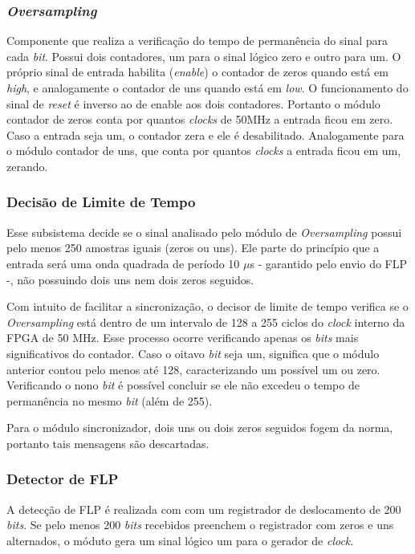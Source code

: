 	\subsubsection{\textit{Oversampling}}
	Componente que realiza a verificação do tempo de permanência do sinal para cada \textit{bit}. Possui dois contadores, um para o sinal lógico zero e outro para um. O próprio sinal de entrada habilita (\textit{enable}) o contador de zeros quando está em \textit{high}, e analogamente o contador de uns quando está em \textit{low}. O funcionamento do sinal de \textit{reset} é inverso ao de enable aos dois contadores. Portanto o módulo contador de zeros conta por quantos \textit{clocks} de 50MHz a entrada ficou em zero. Caso a entrada seja um, o contador zera e ele é desabilitado. Analogamente para o módulo contador de uns, que conta por quantos \textit{clocks} a entrada ficou em um, zerando.

	\subsubsection{Decisão de Limite de Tempo}
	Esse subsistema decide se o sinal analisado pelo módulo de \textit{Oversampling} possui pelo menos 250 amostras iguais (zeros ou uns). Ele parte do princípio que a entrada será uma onda quadrada de período 10 $\mu$s - garantido pelo envio do FLP -, não possuindo dois uns nem dois zeros seguidos.
	
	Com intuito de facilitar a sincronização, o decisor de limite de tempo verifica se o \textit{Oversampling} está dentro de um intervalo de 128 a 255 ciclos do \textit{clock} interno da FPGA de 50 MHz. Esse processo ocorre verificando apenas os \textit{bits} mais significativos do contador. Caso o oitavo \textit{bit} seja um, significa que o módulo anterior contou pelo menos até 128, caracterizando um possível um ou zero. Verificando o nono \textit{bit} é possível concluir se ele não excedeu o tempo de permanência no mesmo \textit{bit} (além de 255). 
	
	Para o módulo sincronizador, dois uns ou dois zeros seguidos fogem da norma, portanto tais mensagens são descartadas.
	
	\subsubsection{Detector de FLP}
	A detecção de FLP é realizada com com um registrador de deslocamento de 200 \textit{bits}. Se pelo menos 200 \textit{bits} recebidos preenchem o registrador com zeros e uns alternados, o móduto gera um sinal lógico um para o gerador de \textit{clock}.
	
